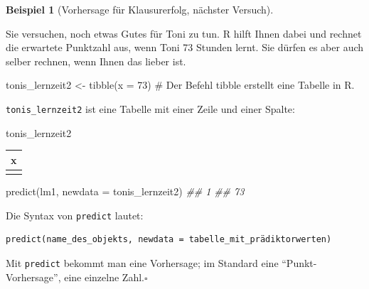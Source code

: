 \documentclass[
  letterpaper,
]{scrbook}
\newenvironment{Shaded}{\begin{snugshade}}{\end{snugshade}}
\newcommand{\AttributeTok}[1]{\textcolor[rgb]{0.40,0.45,0.13}{#1}}
\newcommand{\CommentTok}[1]{\textcolor[rgb]{0.37,0.37,0.37}{#1}}
\newcommand{\DecValTok}[1]{\textcolor[rgb]{0.68,0.00,0.00}{#1}}
\newcommand{\DocumentationTok}[1]{\textcolor[rgb]{0.37,0.37,0.37}{\textit{#1}}}
\newcommand{\FunctionTok}[1]{\textcolor[rgb]{0.28,0.35,0.67}{#1}}
\newcommand{\NormalTok}[1]{\textcolor[rgb]{0.00,0.23,0.31}{#1}}
\newcommand{\OtherTok}[1]{\textcolor[rgb]{0.00,0.23,0.31}{#1}}
\theoremstyle{definition}
\newtheorem{example}{Beispiel}[chapter]
\theoremstyle{definition}
\theoremstyle{definition}
\theoremstyle{remark}
\begin{document}
\begin{example}[Vorhersage für Klausurerfolg, nächster
Versuch]\protect\hypertarget{exm-noten6}{}\label{exm-noten6}

Sie versuchen, noch etwas Gutes für Toni zu tun. R hilft Ihnen dabei und
rechnet die erwartete Punktzahl aus, wenn Toni 73 Stunden lernt. Sie
dürfen es aber auch selber rechnen, wenn Ihnen das lieber ist.

\end{example}

\begin{Shaded}
\begin{Highlighting}[]
\NormalTok{tonis\_lernzeit2 }\OtherTok{\textless{}{-}} \FunctionTok{tibble}\NormalTok{(}\AttributeTok{x =} \DecValTok{73}\NormalTok{)  }\CommentTok{\# Der Befehl \textasciigrave{}tibble\textasciigrave{} erstellt eine Tabelle in R.}
\end{Highlighting}
\end{Shaded}

\texttt{tonis\_lernzeit2} ist eine Tabelle mit einer Zeile und einer
Spalte:

\begin{Shaded}
\begin{Highlighting}[]
\NormalTok{tonis\_lernzeit2}
\end{Highlighting}
\end{Shaded}

\begin{longtable}[]{@{}r@{}}
\toprule\noalign{}
x \\
\midrule\noalign{}
\endhead
\bottomrule\noalign{}
\endlastfoot
73 \\
\end{longtable}

\begin{Shaded}
\begin{Highlighting}[]
\FunctionTok{predict}\NormalTok{(lm1, }\AttributeTok{newdata =}\NormalTok{ tonis\_lernzeit2)}
\DocumentationTok{\#\#  1 }
\DocumentationTok{\#\# 73}
\end{Highlighting}
\end{Shaded}

Die Syntax von \texttt{predict} lautet:

\begin{verbatim}
predict(name_des_objekts, newdata = tabelle_mit_prädiktorwerten)
\end{verbatim}

\begin{tcolorbox}[enhanced jigsaw, colbacktitle=quarto-callout-note-color!10!white, coltitle=black, bottomrule=.15mm, rightrule=.15mm, arc=.35mm, toptitle=1mm, colframe=quarto-callout-note-color-frame, opacitybacktitle=0.6, left=2mm, leftrule=.75mm, breakable, opacityback=0, bottomtitle=1mm, titlerule=0mm, title=\textcolor{quarto-callout-note-color}{\faInfo}\hspace{0.5em}{Hinweis}, colback=white, toprule=.15mm]

Mit \texttt{predict} bekommt man eine Vorhersage; im Standard eine
``Punkt-Vorhersage'', eine einzelne Zahl.\(\square\)

\end{tcolorbox}
\end{document}
